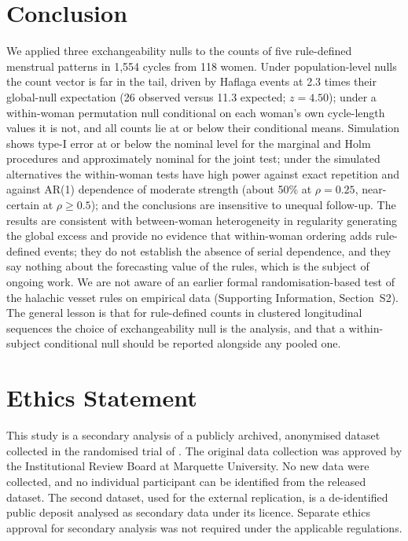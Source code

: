 \documentclass[12pt]{article}
\begin{document}
\section{Conclusion}

We applied three exchangeability nulls to the counts of five rule-defined menstrual
patterns in 1,554 cycles from 118 women. Under population-level nulls the count vector is
far in the tail, driven by Haflaga events at 2.3 times their global-null expectation
(26 observed versus 11.3 expected; $z = 4.50$); under a within-woman permutation null
conditional on each woman's own cycle-length values it is not, and all counts lie at or
below their conditional means. Simulation shows type-I error at or below the nominal
level for the marginal and Holm procedures and approximately nominal for the joint test;
under the simulated alternatives the within-woman tests have high power against
exact repetition and against AR(1) dependence of moderate strength (about 50\% at
$\rho = 0.25$, near-certain at $\rho \geq 0.5$); and the conclusions are insensitive to
unequal follow-up. The results are consistent with
between-woman heterogeneity in regularity generating the global excess and provide no
evidence that within-woman ordering adds rule-defined events; they do not establish the
absence of serial dependence, and they say nothing about the forecasting value of the
rules, which is the subject of ongoing work. We are not aware of an earlier formal
randomisation-based test of the halachic vesset rules on empirical data (Supporting
Information, Section~S2). The general
lesson is that for rule-defined counts in clustered longitudinal sequences the choice of
exchangeability null is the analysis, and that a within-subject conditional null should
be reported alongside any pooled one.

\section*{Ethics Statement}

This study is a secondary analysis of a publicly archived, anonymised dataset
\citep{fehring2012data} collected in the randomised trial of \citet{fehring2013}. The
original data collection was approved by the Institutional Review Board at Marquette
University. No new data were collected, and no individual participant can be identified
from the released dataset. The second dataset, used for the external replication, is a
de-identified public deposit \citep{stanford2023data} analysed as secondary data under
its licence. Separate ethics approval for secondary analysis was not required under the
applicable regulations.
\end{document}
